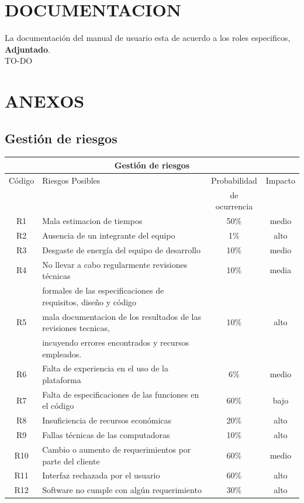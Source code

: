 \documentclass[11pt,letterpaper]{report}
\begin{document}
\chapter{DOCUMENTACION}
La documentación del manual de usuario esta de acuerdo a los roles especificos, \textbf{Adjuntado}.\\
TO-DO
\chapter{ANEXOS}
\section{Gestión de riesgos}
\begin{tabular}{|c|l|c|c|}
	\hline
	\multicolumn{4}{|c|}{Gestión de riesgos}\\ \hline
	Código & Riesgos Posibles & Probabilidad & Impacto \\ 
	& & de ocurrencia & \\ \hline
	R1 & Mala estimacion de tiempos  & 50\% & medio \\ \hline
	R2 & Ausencia de un integrante del equipo & 1\% & alto \\ \hline
	R3 & Desgaste de energía del equipo de desarrollo & 10\% & medio  \\ \hline
	R4 & No llevar a cabo regularmente revisiones técnicas  & 10\% & media \\ 
	& formales de las especificaciones de requisitos, diseño y código & & \\ \hline
	R5 & mala documentacion de los resultados de las revisiones tecnicas,  & 10\% & alto \\ 
	& incuyendo errores encontrados y recursos empleados. && \\ \hline
	R6 & Falta de experiencia en el uso de la plataforma & 6\% & medio \\ \hline
	R7 & Falta de especificaciones de las funciones en el código & 60\% & bajo \\ \hline
	R8 & Insuficiencia de recursos económicas & 20\% & alto \\ \hline
	R9 & Fallas técnicas de las computadoras & 10\% & alto \\ \hline
	R10 & Cambio o aumento de requerimientos por parte del cliente & 60\% & medio \\ \hline
	R11 & Interfaz rechazada por el usuario & 60\% & alto \\ \hline
	R12 & Software no cumple con algún requerimiento & 30\% & alto \\ \hline

\end{tabular}
\end{document}
